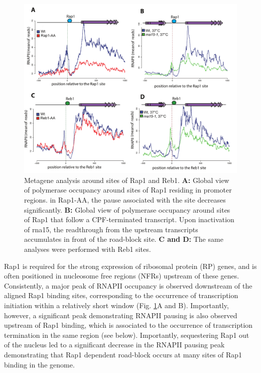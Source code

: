\begin{figure}[h]

\centering
\includegraphics[width=\textwidth]{figures/results/rap/four.pdf}
\caption[Metagene analysis around sites of Rap1 and Reb1.]{Metagene analysis around sites of Rap1 and Reb1. \textbf{A: }Global view of polymerase occupancy around sites of Rap1 residing in promoter regions. in Rap1-AA, the pause associated with the site decreases significantly. \textbf{B: }Global view of polymerase occupancy around sites of  Rap1 that follow  a CPF-terminated transcript. Upon inactivation of rna15, the readthrough from the upstream transcripts accumulates in front of the road-block site. \textbf{C and D: }The same analyses were performed with Reb1 sites.}
\label{fig:four}

\end{figure}

Rap1 is required for the strong expression of ribosomal protein (RP) genes, and is often positioned in nucleosome free regions (NFRs) upstream of these genes. Consistently, a major peak of RNAPII occupancy is observed downstream of the aligned Rap1 binding sites, corresponding to the occurrence of transcription initiation within a relatively short window (Fig. \ref{fig:four}A and B). Importantly, however, a significant peak demonstrating RNAPII pausing is also observed upstream of Rap1 binding, which is associated to the occurrence of transcription termination in the same region (see below). Importantly, sequestering Rap1 out of the nucleus led to a significant decrease in the RNAPII pausing peak demonstrating that Rap1 dependent road-block occurs at many sites of Rap1 binding in the genome.

